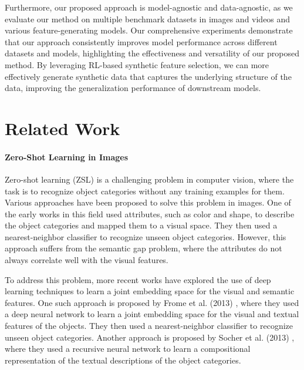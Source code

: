 \documentclass[10pt,twocolumn,letterpaper]{article}
\begin{document}
Furthermore, our proposed approach is model-agnostic and data-agnostic, as we evaluate our method on multiple benchmark datasets in images and videos and various feature-generating models. Our comprehensive experiments demonstrate that our approach consistently improves model performance across different datasets and models, highlighting the effectiveness and versatility of our proposed method. By leveraging RL-based synthetic feature selection, we can more effectively generate synthetic data that captures the underlying structure of the data, improving the generalization performance of downstream models.



\section{Related Work}
\label{sec:background}

\paragraph{Zero-Shot Learning in Images}

Zero-shot learning (ZSL) is a challenging problem in computer vision, where the task is to recognize object categories without any training examples for them. Various approaches have been proposed to solve this problem in images. One of the early works \cite{lampert2009learning} in this field used attributes, such as color and shape, to describe the object categories and mapped them to a visual space. They then used a nearest-neighbor classifier to recognize unseen object categories. However, this approach suffers from the semantic gap problem, where the attributes do not always correlate well with the visual features.

To address this problem, more recent works have explored the use of deep learning techniques to learn a joint embedding space for the visual and semantic features. One such approach is proposed by Frome et al. (2013) \cite{frome2013devise}, where they used a deep neural network to learn a joint embedding space for the visual and textual features of the objects. They then used a nearest-neighbor classifier to recognize unseen object categories. Another approach is proposed by Socher et al. (2013) \cite{socher2013zero}, where they used a recursive neural network to learn a compositional representation of the textual descriptions of the object categories. 
\end{document}
